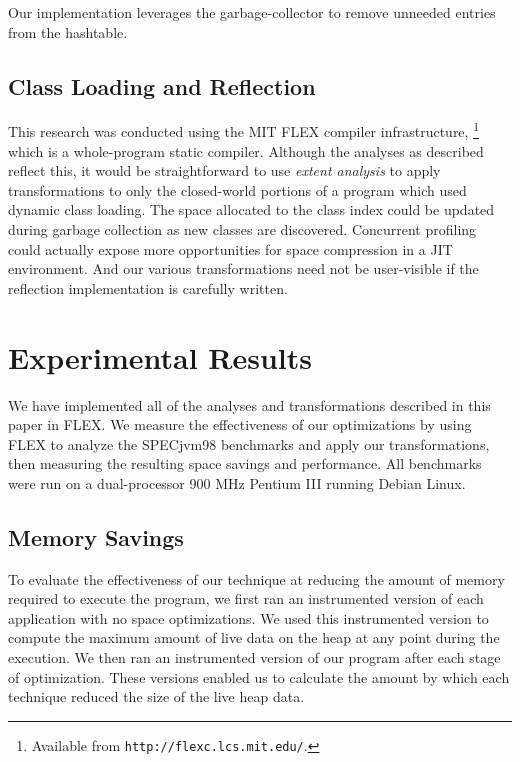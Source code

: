 \documentclass{acmconf}
\begin{document}
Our implementation leverages the garbage-collector to remove unneeded
entries from the hashtable.
%
\subsection{Class Loading and Reflection}
This research was conducted using the MIT FLEX compiler infrastructure,%
\footnote{Available from {\tt http://flexc.lcs.mit.edu/}.} which is a
whole-program static compiler.  Although the analyses as described reflect
this, it would be straightforward to use \emph{extent analysis}
\cite{sreedhar00} to apply transformations to only the closed-world
portions of a program which used dynamic class loading.  The space
allocated to the class index could be updated during garbage collection
as new classes are discovered.  Concurrent profiling could actually
expose more opportunities for space compression in a JIT environment.
And our various transformations need not be user-visible if the
reflection implementation is carefully written.
%
\section{Experimental Results}
\label{sec:results}
%
We have implemented all of the analyses and transformations described
in this paper in FLEX.
We measure the effectiveness
of our optimizations by using FLEX to analyze the SPECjvm98 benchmarks
and apply our transformations,
then measuring the resulting space savings and
performance.   All benchmarks were run on a dual-processor 900 MHz
Pentium III running Debian Linux.
%
\subsection{Memory Savings}
%
To evaluate the effectiveness of our technique at reducing the
amount of memory required to execute the program, 
we first ran an instrumented version of each
application with no space optimizations. We used this
instrumented version to compute the maximum amount of live data on the
heap at any point during the execution.  
We then ran an instrumented version of our program after each stage of
optimization.
These versions enabled us to calculate the amount by which each 
technique reduced the size of the live heap data.
\end{document}
